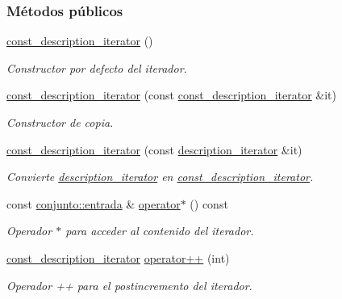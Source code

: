 \subsubsection*{Métodos públicos}
\begin{DoxyCompactItemize}
\item 
\hyperlink{classconjunto_1_1const__description__iterator_ad5fd19cf3233774d3ba5fab94278dd33}{const\-\_\-description\-\_\-iterator} ()
\begin{DoxyCompactList}\small\item\em Constructor por defecto del iterador. \end{DoxyCompactList}\item 
\hyperlink{classconjunto_1_1const__description__iterator_a9cadf7d501cd222b43d0d0df23e2c1e2}{const\-\_\-description\-\_\-iterator} (const \hyperlink{classconjunto_1_1const__description__iterator}{const\-\_\-description\-\_\-iterator} \&it)
\begin{DoxyCompactList}\small\item\em Constructor de copia. \end{DoxyCompactList}\item 
\hyperlink{classconjunto_1_1const__description__iterator_a01c2261887e814df83b69f3eca1fecf2}{const\-\_\-description\-\_\-iterator} (const \hyperlink{classconjunto_1_1description__iterator}{description\-\_\-iterator} \&it)
\begin{DoxyCompactList}\small\item\em Convierte \hyperlink{classconjunto_1_1description__iterator}{description\-\_\-iterator} en \hyperlink{classconjunto_1_1const__description__iterator}{const\-\_\-description\-\_\-iterator}. \end{DoxyCompactList}\item 
const \hyperlink{classconjunto_a09cad766dd65de73e51eae21f9d22585}{conjunto\-::entrada} \& \hyperlink{classconjunto_1_1const__description__iterator_a114b37c1f548b95cd5e567d14a82137f}{operator$\ast$} () const 
\begin{DoxyCompactList}\small\item\em Operador $\ast$ para acceder al contenido del iterador. \end{DoxyCompactList}\item 
\hyperlink{classconjunto_1_1const__description__iterator}{const\-\_\-description\-\_\-iterator} \hyperlink{classconjunto_1_1const__description__iterator_a6e102f59a677e3bf43aec62609531b11}{operator++} (int)
\begin{DoxyCompactList}\small\item\em Operador ++ para el postincremento del iterador. \end{DoxyCompactList}\item 

\end{DoxyCompactItemize}
